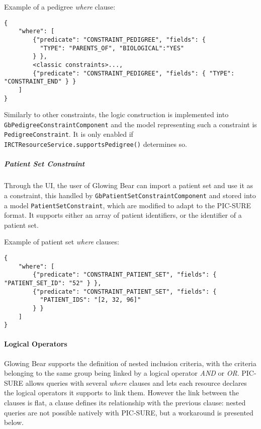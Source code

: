 Example of a pedigree \emph{where} clause:
\begin{verbatim}
{
    "where": [
        {"predicate": "CONSTRAINT_PEDIGREE", "fields": { 
          "TYPE": "PARENTS_OF", "BIOLOGICAL":"YES" 
        } },
        <classic constraints>..., 
        {"predicate": "CONSTRAINT_PEDIGREE", "fields": { "TYPE": "CONSTRAINT_END" } }
    ]
}
\end{verbatim}

Similarly to other constraints, the logic construction is implemented into \\
\verb|GbPedigreeConstraintComponent| and the model representing such a constraint is \verb|PedigreeConstraint|.
It is only enabled if \verb|IRCTResourceService.supportsPedigree()| determines so.

\subparagraph{Patient Set Constraint}
Through the UI, the user of Glowing Bear can import a patient set and use it as a constraint, this handled by \verb|GbPatientSetConstraintComponent| and stored into a model \verb|PatientSetConstraint|, which are modified to adapt to the PIC-SURE format.
It supports either an array of patient identifiers, or the identifier of a patient set.

Example of patient set \emph{where} clauses:
\begin{verbatim}
{
    "where": [
        {"predicate": "CONSTRAINT_PATIENT_SET", "fields": { "PATIENT_SET_ID": "52" } },
        {"predicate": "CONSTRAINT_PATIENT_SET", "fields": { 
          "PATIENT_IDS": "[2, 32, 96]" 
        } }
    ]
}
\end{verbatim}


\paragraph{Logical Operators}
\label{sec:gb-logical-operators}

Glowing Bear supports the definition of nested inclusion criteria, with the criteria belonging to the same group being linked by a logical operator \emph{AND} or \emph{OR}.
PIC-SURE allows queries with several \emph{where} clauses and lets each resource declares the logical operators it supports to link them. 
However the link between the clauses is flat, a clause defines its relationship with the previous clause: nested queries are not possible natively with PIC-SURE, but a workaround is presented below.

